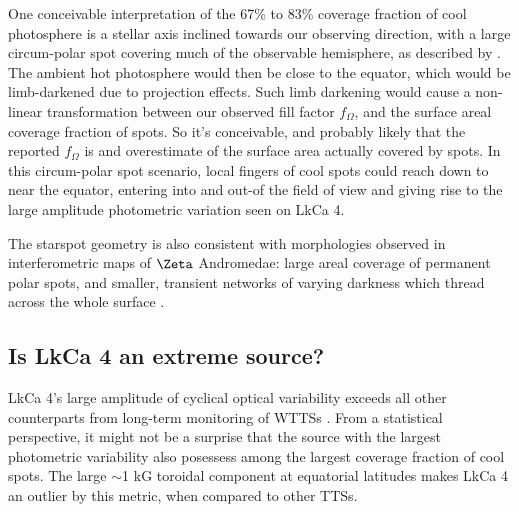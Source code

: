 \documentclass[twocolumn]{emulateapj}%
\newcommand{\name}{LkCa 4 }
\begin{document}
One conceivable interpretation of the 67\% to 83\% coverage fraction of cool photosphere is a stellar axis inclined towards our observing direction, with a large circum-polar spot covering much of the observable hemisphere, as described by \citet{donati14}.  The ambient hot photosphere would then be close to the equator, which would be limb-darkened due to projection effects.  Such limb darkening would cause a non-linear transformation between our observed fill factor $f_{\Omega}$, and the surface areal coverage fraction of spots.  So it's conceivable, and probably likely that the reported $f_{\Omega}$ is and overestimate of the surface area actually covered by spots.  In this circum-polar spot scenario, local fingers of cool spots could reach down to near the equator, entering into and out-of the field of view and giving rise to the large amplitude photometric variation seen on LkCa 4.  

The starspot geometry is also consistent with morphologies observed in interferometric maps of $\Zeta$ Andromedae: large areal coverage of permanent polar spots, and smaller, transient networks of varying darkness which thread across the whole surface \citep{roettenbacher16}.



\subsection{Is \name an extreme source?}
LkCa 4's large amplitude of cyclical optical variability exceeds all other counterparts from long-term monitoring of WTTSs \citep{grankin08}.  From a statistical perspective, it might not be a surprise that the source with the largest photometric variability also posessess among the largest coverage fraction of cool spots.  The large $\sim$1 kG toroidal component at equatorial latitudes makes LkCa 4 an outlier by this metric, when compared to other TTSs.
\end{document}
